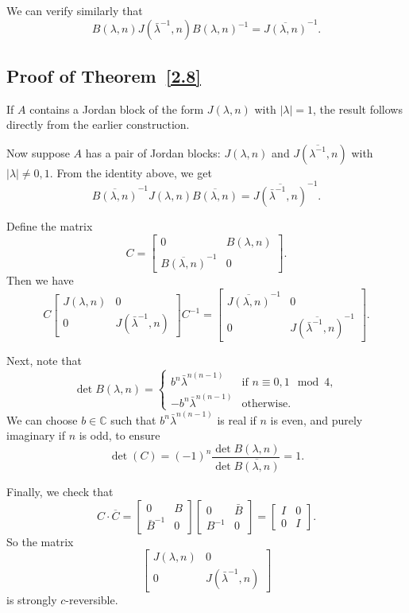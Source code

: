 \documentclass[11pt]{amsart}
\numberwithin{equation}{section}
\theoremstyle{plain}
\theoremstyle{definition}
\newcommand{\thmref}[1]{Theorem~\ref{#1}}
\numberwithin{equation}{section}
\begin{document}
We can verify similarly that
\[
B(\lambda,n) J(\bar{\lambda}^{-1},n) B(\lambda,n)^{-1} = \overline{J(\lambda,n)}^{-1}.
\]
\subsection*{Proof of \thmref{2.8}}
If $A$ contains a Jordan block of the form $J(\lambda,n)$ with $|\lambda|=1$, the result follows directly from the earlier construction.

Now suppose $A$ has a pair of Jordan blocks: $J(\lambda,n)$ and $J(\overline{\lambda^{-1}},n)$ with $|\lambda|\ne 0,1$. From the identity above, we get
\[
\overline{B(\lambda,n)}^{-1} J(\lambda,n) \overline{B(\lambda,n)} = \overline{J(\bar{\lambda}^{-1},n)}^{-1}.
\]

Define the matrix
\[
C = \begin{bmatrix}
0 & B(\lambda,n) \\
\overline{B(\lambda,n)}^{-1} & 0
\end{bmatrix}.
\]
Then we have
\[
C \begin{bmatrix}
J(\lambda,n) & 0 \\
0 & J(\bar{\lambda}^{-1},n)
\end{bmatrix} C^{-1} = 
\begin{bmatrix}
\overline{J(\lambda,n)}^{-1} & 0 \\
0 & \overline{J(\bar{\lambda}^{-1},n)}^{-1}
\end{bmatrix}.
\]

Next, note that
\[
\det B(\lambda,n) = 
\begin{cases}
b^n \bar{\lambda}^{n(n-1)} & \text{if } n \equiv 0,1 \mod 4, \\
-b^n \bar{\lambda}^{n(n-1)} & \text{otherwise}.
\end{cases}
\]
We can choose $b\in \mathbb{C}$ such that $b^n \bar{\lambda}^{n(n-1)}$ is real if $n$ is even, and purely imaginary if $n$ is odd, to ensure
\[
\det(C) = (-1)^n \frac{\det B(\lambda,n)}{\det \overline{B(\lambda,n)}} = 1.
\]

Finally, we check that
\[
C \cdot \overline{C} = 
\begin{bmatrix}
0 & B \\
\bar{B}^{-1} & 0
\end{bmatrix}
\begin{bmatrix}
0 & \bar{B} \\
B^{-1} & 0
\end{bmatrix}
= \begin{bmatrix}
I & 0 \\
0 & I
\end{bmatrix}. 
\]
So the matrix 
\[
\begin{bmatrix}
J(\lambda,n) & 0 \\
0 & J(\bar{\lambda}^{-1},n)
\end{bmatrix}
\]
is strongly $c$-reversible. 
\end{document}
